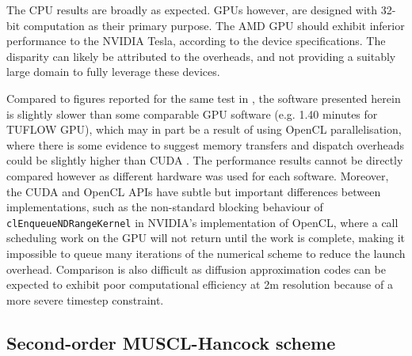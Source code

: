 The CPU results are broadly as expected. GPUs however, are designed with 32-bit computation as their primary purpose. The AMD GPU should exhibit inferior performance to the NVIDIA Tesla, according to the device specifications. The disparity can likely be attributed to the overheads, and not providing a suitably large domain to fully leverage these devices.

Compared to figures reported for the same test in \citet{Pender2013}, the software presented herein is slightly slower than some comparable GPU software (e.g. 1.40 minutes for TUFLOW GPU), which may in part be a result of using OpenCL parallelisation, where there is some evidence to suggest memory transfers and dispatch overheads could be slightly higher than CUDA \citep[e.g.][]{Karimi2010}. The performance results cannot be directly compared however as different hardware was used for each software. Moreover, the CUDA and OpenCL APIs have subtle but important differences between implementations, such as the non-standard blocking behaviour of \texttt{clEnqueueNDRangeKernel} in NVIDIA's implementation of OpenCL, where a call scheduling work on the GPU will not return until the work is complete, making it impossible to queue many iterations of the numerical scheme to reduce the launch overhead. Comparison is also difficult as diffusion approximation codes \citep[e.g.][]{Bates2000} can be expected to exhibit poor computational efficiency at 2m resolution because of a more severe timestep constraint.

\subsection{Second-order MUSCL-Hancock scheme}

